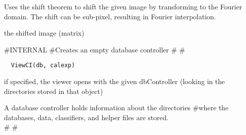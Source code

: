 \documentclass[a4paper]{book}
\begin{document}
%
\begin{Details}\relax
Uses the shift theorem to shift the given image by
transforming to the Fourier domain.  The shift can be
sub-pixel, resulting in Fourier interpolation.
\end{Details}
%
\begin{Value}
the shifted image (matrix)
\end{Value}
%
\begin{Description}\relax
\#INTERNAL \#Creates an empty database controller \# \#
\end{Description}
%
\begin{Usage}
\begin{verbatim}
  ViewCI(db, calexp)
\end{verbatim}
\end{Usage}
%
\begin{Arguments}
\begin{ldescription}
\item[\code{db}] if specified, the viewer opens with the given
dbController (looking in the directories stored in that
object)
\end{ldescription}
\end{Arguments}
%
\begin{Details}\relax
A database controller holds information about the
directories \#where the databases, data, classifiers, and
helper files are stored. \\{} \# \#
\end{Details}
%
\end{document}
